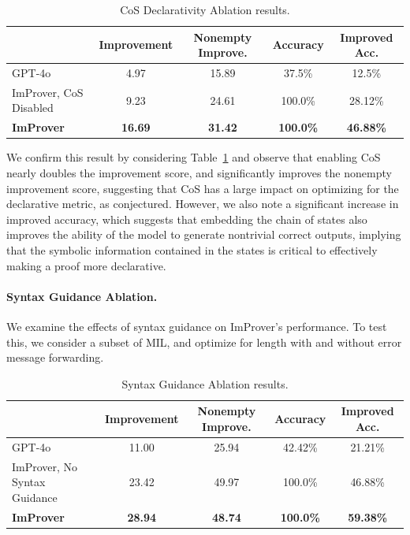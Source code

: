\begin{table}[t]
\caption{CoS Declarativity Ablation results.}
\label{tab:read-abl}
\centering
\small
\begin{tabular}{l|cccc}
\toprule
& Improvement & Nonempty Improve. & Accuracy & Improved Acc.\\
\midrule
GPT-4o & 4.97 & 15.89 & 37.5\% & 12.5\% \\
ImProver, CoS Disabled & 9.23 & 24.61 & 100.0\% & 28.12\% \\
\textbf{ImProver} & \textbf{16.69} & \textbf{31.42} & \textbf{100.0\%} & \textbf{46.88\%} \\
\bottomrule
\end{tabular}
\end{table}

We confirm this result by considering Table~\ref{tab:read-abl} and observe that enabling CoS nearly doubles the improvement score, and significantly improves the nonempty improvement score, suggesting that CoS has a large impact on optimizing for the declarative metric, as conjectured. However, we also note a significant increase in improved accuracy, which suggests that embedding the chain of states also improves the ability of the model to generate nontrivial correct outputs, implying that the symbolic information contained in the states is critical to effectively making a proof more declarative.

\paragraph{Syntax Guidance Ablation.} We examine the effects of syntax guidance on ImProver's performance. To test this, we consider a subset of MIL, and optimize for length with and without error message forwarding.

\begin{table}[t]
\caption{Syntax Guidance Ablation results.}
\label{tab:syn-abl}
\centering
\small
\begin{tabular}{l|cccc}
\toprule
& Improvement & Nonempty Improve. & Accuracy & Improved Acc.\\
\midrule
GPT-4o & 11.00 & 25.94 & 42.42\% & 21.21\% \\
ImProver, No Syntax Guidance & 23.42 & 49.97 & 100.0\% & 46.88\% \\
\textbf{ImProver} & \textbf{28.94} & \textbf{48.74} & \textbf{100.0\%} & \textbf{59.38\%} \\
\bottomrule
\end{tabular}
\end{table}

